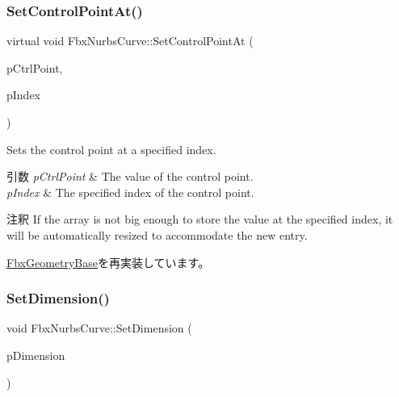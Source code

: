 \mbox{\label{class_fbx_nurbs_curve_a7313bcfe1a7b6d566f30e5395bf89877}} 
\subsubsection{\texorpdfstring{Set\+Control\+Point\+At()}{SetControlPointAt()}}
{\footnotesize\ttfamily virtual void Fbx\+Nurbs\+Curve\+::\+Set\+Control\+Point\+At (\begin{DoxyParamCaption}\item[{const \hyperlink{class_fbx_vector4}{Fbx\+Vector4} \&}]{p\+Ctrl\+Point,  }\item[{int}]{p\+Index }\end{DoxyParamCaption})\hspace{0.3cm}{\ttfamily [virtual]}}

Sets the control point at a specified index. 
\begin{DoxyParams}{引数}
{\em p\+Ctrl\+Point} & The value of the control point. \\
\hline
{\em p\+Index} & The specified index of the control point.\\
\hline
\end{DoxyParams}
\begin{DoxyRemark}{注釈}
If the array is not big enough to store the value at the specified index, it will be automatically resized to accommodate the new entry. 
\end{DoxyRemark}


\hyperlink{class_fbx_geometry_base_ab2d5567b073e6b9f4feb5bb428fa99e4}{Fbx\+Geometry\+Base}を再実装しています。

\mbox{\label{class_fbx_nurbs_curve_a97134fe64a13da3a87879adf8a6c69c5}} 
\subsubsection{\texorpdfstring{Set\+Dimension()}{SetDimension()}}
{\footnotesize\ttfamily void Fbx\+Nurbs\+Curve\+::\+Set\+Dimension (\begin{DoxyParamCaption}\item[{\hyperlink{class_fbx_nurbs_curve_a95d4a63cff6dd62901ea39c268336122}{E\+Dimension}}]{p\+Dimension }\end{DoxyParamCaption})}

